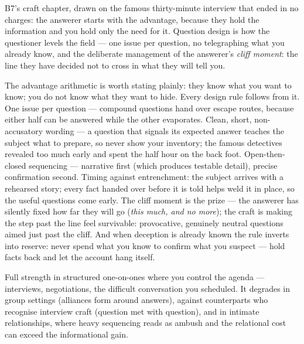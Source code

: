 \begin{core}
B7's craft chapter, drawn on the famous thirty-minute interview that ended in no charges: the answerer starts with the advantage, because they hold the information and you hold only the need for it. Question design is how the questioner levels the field --- one issue per question, no telegraphing what you already know, and the deliberate management of the answerer's \emph{cliff moment}: the line they have decided not to cross in what they will tell you.
\end{core}
\begin{mechanism}
The advantage arithmetic is worth stating plainly: they know what you want to know; you do not know what they want to hide. Every design rule follows from it. One issue per question --- compound questions hand over escape routes, because either half can be answered while the other evaporates. Clean, short, non-accusatory wording --- a question that signals its expected answer teaches the subject what to prepare, so never show your inventory; the famous detectives revealed too much early and spent the half hour on the back foot. Open-then-closed sequencing --- narrative first (which produces testable detail), precise confirmation second. Timing against entrenchment: the subject arrives with a rehearsed story; every fact handed over before it is told helps weld it in place, so the useful questions come early. The cliff moment is the prize --- the answerer has silently fixed how far they will go (\emph{this much, and no more}); the craft is making the step past the line feel survivable: provocative, genuinely neutral questions aimed just past the cliff. And when deception is already known the rule inverts into reserve: never spend what you know to confirm what you suspect --- hold facts back and let the account hang itself.
\end{mechanism}
\begin{conditions}
Full strength in structured one-on-ones where you control the agenda --- interviews, negotiations, the difficult conversation you scheduled. It degrades in group settings (alliances form around answers), against counterparts who recognise interview craft (question met with question), and in intimate relationships, where heavy sequencing reads as ambush and the relational cost can exceed the informational gain.
\end{conditions}
